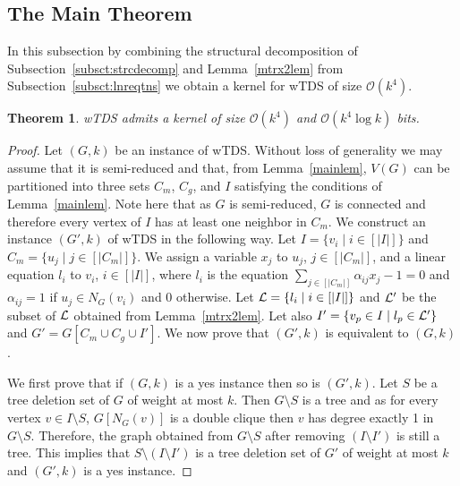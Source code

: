 \documentclass[a4paper,11pt]{article}
\newtheorem{theorem}{Theorem}
\newcommand{\Oh}{{\mathcal{O}}}
\begin{document}
\subsection{The Main Theorem}

In this subsection by combining the structural decomposition of Subsection~\ref{subsct:strcdecomp} 
and Lemma~\ref{mtrx2lem} from Subsection~\ref{subsct:lnreqtns} we obtain a kernel for {\sc wTDS} of size $\Oh(k^{4})$.

\begin{theorem} 
{\sc wTDS} admits a kernel of size $\Oh(k^{4})$ and  $\Oh(k^{4}\log k)$ bits.
\end{theorem}
\begin{proof}
Let $(G,k)$ be an instance of {\sc wTDS}. Without loss of generality we may assume that it is semi-reduced and that, 
from Lemma~\ref{mainlem}, $V(G)$ can be partitioned into 
three sets $C_{m}$, $C_{g}$, and $I$ satisfying the conditions of Lemma~\ref{mainlem}. Note here that as $G$ is semi-reduced, $G$ is connected and therefore
every vertex of $I$ has at least one neighbor in $C_{m}$.
We construct an instance $(G',k)$ of {\sc wTDS} in the following way.
Let $I=\{v_{i}\mid i\in[|I|]\}$ and $C_{m}=\{u_{j}\mid j\in [|C_{m}|]\}$. We assign a variable $x_{j}$ to $u_{j}$, $j\in [|C_{m}|]$, and a linear equation $l_{i}$
to $v_{i}$, $i\in [|I|]$, where $l_{i}$ is the equation $\displaystyle\sum_{j\in [|C_{m}|]}\alpha_{ij}x_{j}-1=0$ and $\alpha_{ij}=1$ if $u_{j}\in N_{G}(v_{i})$ 
and 0 otherwise. Let ${\cal L}=\{l_{i}\mid i\in [|I|]\}$ and ${\cal L}'$ be the subset of ${\cal L}$ obtained from Lemma~\ref{mtrx2lem}. 
Let also $I' = \{v_{p}\in I\mid l_{p}\in {\cal L}'\}$ and $G'=G[C_{m}\cup C_{g}\cup I']$. We now prove that $(G',k)$ is equivalent to $(G,k)$. 

We first prove that if $(G,k)$ is a yes instance then so is $(G',k)$.
Let $S$ be a tree deletion set of $G$ of weight at most $k$. Then $G\setminus S$ is a tree and as for every vertex $v\in I\setminus S$, 
$G[N_{G}(v)]$ is a double clique then $v$ has degree exactly 1 in $G\setminus S$. Therefore, the graph obtained from $G\setminus S$ 
after removing $(I\setminus I')$ is still a tree. This implies that $S\setminus (I\setminus I')$ is a tree deletion
set of $G'$ of weight at most $k$ and $(G',k)$ is a yes instance.


\end{proof}
\end{document}
